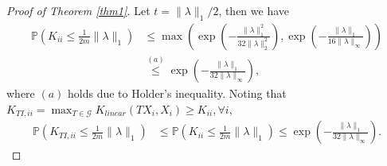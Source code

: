 \documentclass{article}
\theoremstyle{plain}
\theoremstyle{definition}
\theoremstyle{remark}
\begin{document}
\begin{proof}[Proof of Theorem \ref{thm1}]
Let $t = \|\lambda\|_1 / 2$, then we have
\begin{align*}
    \mathbb{P}\left(K_{ii} \le \frac{1}{2m} \|\lambda\|_1 \right) &\le \max \left(\exp\left(-\frac{\|\lambda\|_1^2}{32\|\lambda\|_2^2}\right), \exp\left(-\frac{\|\lambda\|_1}{16\|\lambda\|_{\infty}}\right)\right) \\
    &\stackrel{(a)}{\leq} \exp\left(-\frac{\|\lambda\|_1}{32\|\lambda\|_{\infty}}\right),
\end{align*}
where $(a)$ holds due to Holder's inequality. Noting that $K_{TI, ii} = \max_{T \in \mathcal{G}} K_{linear}(T X_i, X_i) \ge K_{ii}, \forall i$,
\begin{align}
\label{eqn:diagnoal}
     \mathbb{P}(K_{TI, ii} \le \frac{1}{2m} \|\lambda\|_1) &\le  \mathbb{P}(K_{ii} \le \frac{1}{2m} \|\lambda\|_1) \le \exp\left(-\frac{\|\lambda\|_1}{32\|\lambda\|_{\infty}}\right).
\end{align}


\end{proof}
\end{document}
